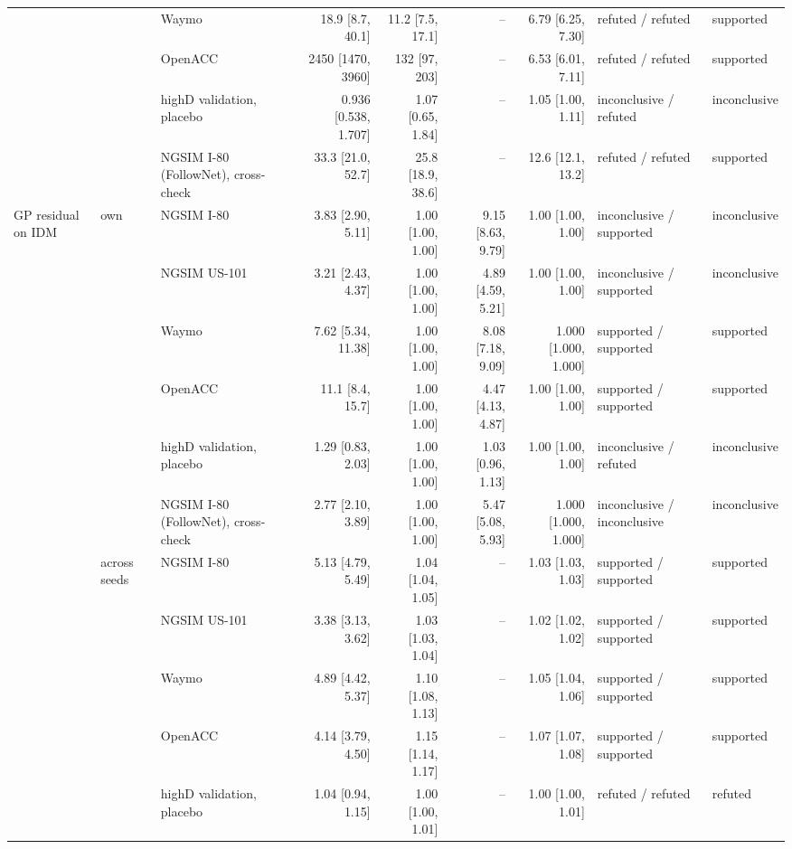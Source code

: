 \begin{longtable}{lllrrrrll}
 &  & Waymo & 18.9 [8.7, 40.1] & 11.2 [7.5, 17.1] & -- & 6.79 [6.25, 7.30] & refuted / refuted & supported \\
 &  & OpenACC & 2450 [1470, 3960] & 132 [97, 203] & -- & 6.53 [6.01, 7.11] & refuted / refuted & supported \\
 &  & highD validation, placebo & 0.936 [0.538, 1.707] & 1.07 [0.65, 1.84] & -- & 1.05 [1.00, 1.11] & inconclusive / refuted & inconclusive \\
 &  & NGSIM I-80 (FollowNet), cross-check & 33.3 [21.0, 52.7] & 25.8 [18.9, 38.6] & -- & 12.6 [12.1, 13.2] & refuted / refuted & supported \\
\midrule
GP residual on IDM & own & NGSIM I-80 & 3.83 [2.90, 5.11] & 1.00 [1.00, 1.00] & 9.15 [8.63, 9.79] & 1.00 [1.00, 1.00] & inconclusive / supported & inconclusive \\
 &  & NGSIM US-101 & 3.21 [2.43, 4.37] & 1.00 [1.00, 1.00] & 4.89 [4.59, 5.21] & 1.00 [1.00, 1.00] & inconclusive / supported & inconclusive \\
 &  & Waymo & 7.62 [5.34, 11.38] & 1.00 [1.00, 1.00] & 8.08 [7.18, 9.09] & 1.000 [1.000, 1.000] & supported / supported & supported \\
 &  & OpenACC & 11.1 [8.4, 15.7] & 1.00 [1.00, 1.00] & 4.47 [4.13, 4.87] & 1.00 [1.00, 1.00] & supported / supported & supported \\
 &  & highD validation, placebo & 1.29 [0.83, 2.03] & 1.00 [1.00, 1.00] & 1.03 [0.96, 1.13] & 1.00 [1.00, 1.00] & inconclusive / refuted & inconclusive \\
 &  & NGSIM I-80 (FollowNet), cross-check & 2.77 [2.10, 3.89] & 1.00 [1.00, 1.00] & 5.47 [5.08, 5.93] & 1.000 [1.000, 1.000] & inconclusive / inconclusive & inconclusive \\
\midrule
 & across seeds & NGSIM I-80 & 5.13 [4.79, 5.49] & 1.04 [1.04, 1.05] & -- & 1.03 [1.03, 1.03] & supported / supported & supported \\
 &  & NGSIM US-101 & 3.38 [3.13, 3.62] & 1.03 [1.03, 1.04] & -- & 1.02 [1.02, 1.02] & supported / supported & supported \\
 &  & Waymo & 4.89 [4.42, 5.37] & 1.10 [1.08, 1.13] & -- & 1.05 [1.04, 1.06] & supported / supported & supported \\
 &  & OpenACC & 4.14 [3.79, 4.50] & 1.15 [1.14, 1.17] & -- & 1.07 [1.07, 1.08] & supported / supported & supported \\
 &  & highD validation, placebo & 1.04 [0.94, 1.15] & 1.00 [1.00, 1.01] & -- & 1.00 [1.00, 1.01] & refuted / refuted & refuted \\

\end{longtable}
